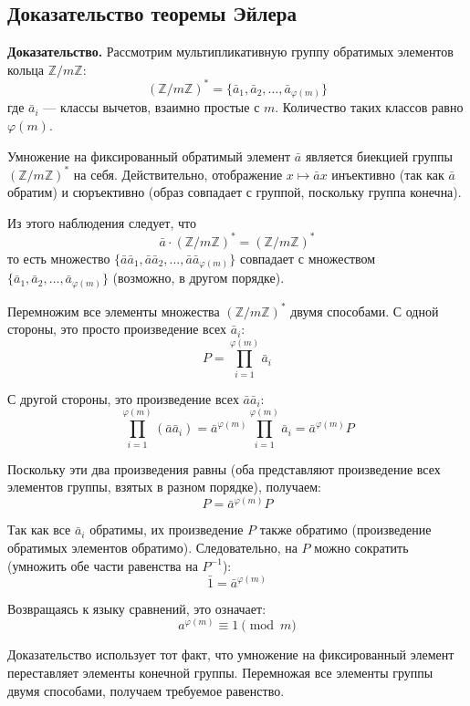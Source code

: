 \documentclass[a4paper,12pt]{article}
\theoremstyle{definition}
\theoremstyle{plain}
\theoremstyle{remark}
\begin{document}
	\subsection{Доказательство теоремы Эйлера}
	
	\noindent \textbf{Доказательство.}
	Рассмотрим мультипликативную группу обратимых элементов кольца $\mathbb{Z}/m\mathbb{Z}$:
	\[
	(\mathbb{Z}/m\mathbb{Z})^* = \{\bar{a}_1, \bar{a}_2, \dots, \bar{a}_{\varphi(m)}\}
	\]
	где $\bar{a}_i$ — классы вычетов, взаимно простые с $m$. Количество таких классов равно $\varphi(m)$.
	
	\begin{tcolorbox}[colback=blue!5, colframe=blue!40!black, title=Ключевое наблюдение]
		Умножение на фиксированный обратимый элемент $\bar{a}$ является биекцией группы $(\mathbb{Z}/m\mathbb{Z})^*$ на себя. Действительно, отображение $x \mapsto \bar{a}x$ инъективно (так как $\bar{a}$ обратим) и сюръективно (образ совпадает с группой, поскольку группа конечна).
	\end{tcolorbox}
	
	Из этого наблюдения следует, что
	\[
	\bar{a} \cdot (\mathbb{Z}/m\mathbb{Z})^* = (\mathbb{Z}/m\mathbb{Z})^*
	\]
	то есть множество $\{\bar{a}\bar{a}_1, \bar{a}\bar{a}_2, \dots, \bar{a}\bar{a}_{\varphi(m)}\}$ совпадает с множеством $\{\bar{a}_1, \bar{a}_2, \dots, \bar{a}_{\varphi(m)}\}$ (возможно, в другом порядке).
	
	Перемножим все элементы множества $(\mathbb{Z}/m\mathbb{Z})^*$ двумя способами. С одной стороны, это просто произведение всех $\bar{a}_i$:
	\[
	P = \prod_{i=1}^{\varphi(m)} \bar{a}_i
	\]
	
	С другой стороны, это произведение всех $\bar{a}\bar{a}_i$:
	\[
	\prod_{i=1}^{\varphi(m)} (\bar{a}\bar{a}_i) = \bar{a}^{\varphi(m)} \prod_{i=1}^{\varphi(m)} \bar{a}_i = \bar{a}^{\varphi(m)} P
	\]
	
	Поскольку эти два произведения равны (оба представляют произведение всех элементов группы, взятых в разном порядке), получаем:
	\[
	P = \bar{a}^{\varphi(m)} P
	\]
	
	Так как все $\bar{a}_i$ обратимы, их произведение $P$ также обратимо (произведение обратимых элементов обратимо). Следовательно, на $P$ можно сократить (умножить обе части равенства на $P^{-1}$):
	\[
	\bar{1} = \bar{a}^{\varphi(m)}
	\]
	
	Возвращаясь к языку сравнений, это означает:
	\[
	a^{\varphi(m)} \equiv 1 \pmod{m}
	\]
	
	\begin{tcolorbox}[colback=green!5, colframe=green!50!black, title=Пояснение]
		Доказательство использует тот факт, что умножение на фиксированный элемент переставляет элементы конечной группы. Перемножая все элементы группы двумя способами, получаем требуемое равенство.
	\end{tcolorbox}
	
\end{document}
